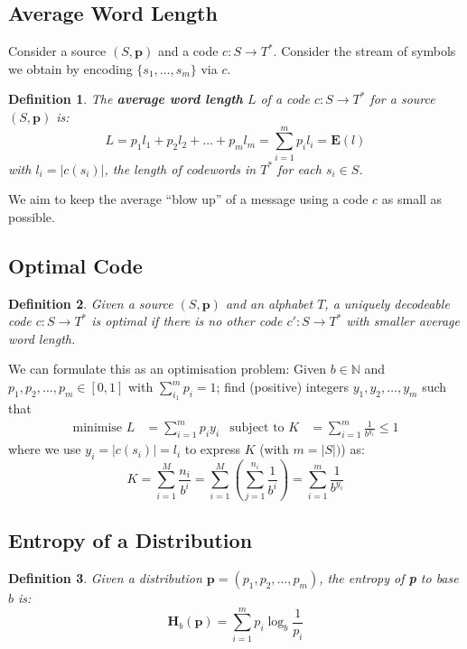 \documentclass[11pt]{article}
\newtheorem{defn}{Definition}
\begin{document}
\subsection{Average Word Length}
Consider a source $(S, \textbf{p})$ and a code $c : S \rightarrow T^*$.
Consider the stream of symbols we obtain by encoding $\{ s_1, \ldots, s_m \}$ via $c$.

\begin{defn}
  The \textbf{average word length} $L$ of a code $c : S \rightarrow T^*$ for a source $(S, \textbf{p})$ is:
  \[
    L = p_1l_1 + p_2l_2 + \ldots + p_ml_m = \sum_{i = 1}^m p_il_i = \textbf{E}(l)
  \]
  with $l_i = \lvert c(s_i) \rvert$, the length of codewords in $T^*$ for each $s_i \in S$.
\end{defn}

We aim to keep the average ``blow up'' of a message using a code $c$ as small as possible.

\subsection{Optimal Code}
\begin{defn}
  Given a source $(S, \textbf{p})$ and an alphabet $T$, a uniquely decodeable code $c : S \rightarrow T^*$ is optimal if there is no other code $c' : S \rightarrow T^*$ with smaller average word length.
\end{defn}

We can formulate this as an optimisation problem:
Given $b \in \mathbb{N}$ and $p_1, p_2, \ldots, p_m \in [0, 1]$ with $\sum_{i_1}^m p_i = 1$; find (positive) integers $y_1, y_2, \ldots, y_m$ such that
\begin{align*}
  \text{minimise } L &= \sum_{i = 1}^m p_iy_i & \text{subject to } K &= \sum_{i = 1}^m \frac{1}{b^{y_1}} \leq 1
\end{align*}
where we use $y_i = \lvert c(s_i) \rvert = l_i$ to express $K$ (with $m = \lvert S \rvert)$) as:
\[
  K = \sum_{i = 1}^M \frac{n_i}{b^i} = \sum_{i = 1}^M (\sum_{j = 1}^{n_i} \frac{1}{b^i}) = \sum_{i = 1}^m \frac{1}{b^{y_i}}
\]

\subsection{Entropy of a Distribution}
\begin{defn}
  Given a distribution $\textbf{p} = (p_1, p_2, \ldots, p_m)$, the entropy of \textbf{p} to base $b$ is:
  \[
    \textbf{H}_b(\textbf{p}) = \sum_{i = 1}^m p_i\log_b \frac{1}{p_i}
  \]
\end{defn}
\end{document}
